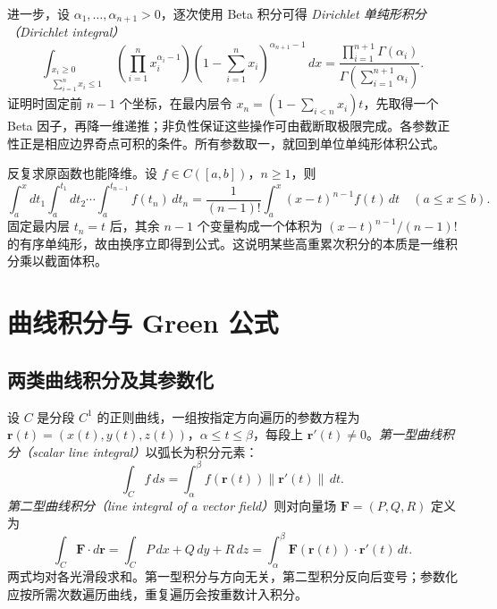 进一步，设 $\alpha_1,\ldots,\alpha_{n+1}>0$，逐次使用 Beta 积分可得 \emph{Dirichlet 单纯形积分（Dirichlet integral）}
\begin{equation}
\label{eq:pei-dirichlet-simplex}
\int_{\substack{x_i\ge0\\\sum_{i=1}^nx_i\le1}}
\left(\prod_{i=1}^nx_i^{\alpha_i-1}\right)
\left(1-\sum_{i=1}^nx_i\right)^{\alpha_{n+1}-1}\,dx
=\frac{\prod_{i=1}^{n+1}\Gamma(\alpha_i)}
{\Gamma(\sum_{i=1}^{n+1}\alpha_i)}.
\end{equation}
证明时固定前 $n-1$ 个坐标，在最内层令 $x_n=(1-\sum_{i<n}x_i)t$，先取得一个 Beta 因子，再降一维递推；非负性保证这些操作可由截断取极限完成。各参数正性正是相应边界奇点可积的条件。所有参数取一，就回到单位单纯形体积公式。

反复求原函数也能降维。设 $f\in C([a,b])$，$n\ge1$，则
\begin{equation}
\label{eq:pei-repeated-integration}
\int_a^xdt_1\int_a^{t_1}dt_2\cdots
\int_a^{t_{n-1}}f(t_n)\,dt_n
=\frac1{(n-1)!}\int_a^x(x-t)^{n-1}f(t)\,dt
\quad(a\le x\le b).
\end{equation}
固定最内层 $t_n=t$ 后，其余 $n-1$ 个变量构成一个体积为 $(x-t)^{n-1}/(n-1)!$ 的有序单纯形，故由换序立即得到公式。这说明某些高重累次积分的本质是一维积分乘以截面体积。

\section{曲线积分与 Green 公式}
\label{sec:pei-line-green}

\subsection{两类曲线积分及其参数化}

设 $C$ 是分段 $C^1$ 的正则曲线，一组按指定方向遍历的参数方程为 $\boldsymbol r(t)=(x(t),y(t),z(t))$，$\alpha\le t\le\beta$，每段上 $\boldsymbol r'(t)\ne0$。\emph{第一型曲线积分（scalar line integral）}以弧长为积分元素：
\begin{equation}
\label{eq:pei-scalar-line}
\int_Cf\,ds=\int_\alpha^\beta f(\boldsymbol r(t))\|\boldsymbol r'(t)\|\,dt.
\end{equation}
\emph{第二型曲线积分（line integral of a vector field）}则对向量场 $\boldsymbol F=(P,Q,R)$ 定义为
\begin{equation}
\label{eq:pei-vector-line}
\int_C\boldsymbol F\cdot d\boldsymbol r
=\int_C P\,dx+Q\,dy+R\,dz
=\int_\alpha^\beta\boldsymbol F(\boldsymbol r(t))\cdot\boldsymbol r'(t)\,dt.
\end{equation}
两式均对各光滑段求和。第一型积分与方向无关，第二型积分反向后变号；参数化应按所需次数遍历曲线，重复遍历会按重数计入积分。

